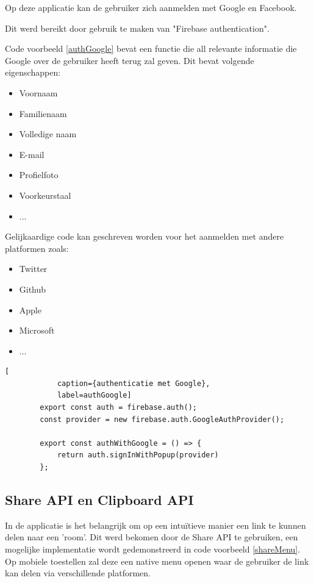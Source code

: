 		Op deze applicatie kan de gebruiker zich aanmelden met Google en Facebook.
		
		Dit werd bereikt door gebruik te maken van "Firebase authentication".
		
		\newpage
		Code voorbeeld \ref{authGoogle} bevat een functie die all relevante informatie die Google over de gebruiker heeft terug zal geven. Dit bevat volgende eigenschappen:
		\begin{itemize}
			\item Voornaam
			\item Familienaam
			\item Volledige naam
			\item E-mail
			\item Profielfoto
			\item Voorkeurstaal
			\item ...
		\end{itemize} 
		
		
		Gelijkaardige code kan geschreven worden voor het aanmelden met andere platformen zoals:
		\begin{itemize}
			\item Twitter
			\item Github
			\item Apple
			\item Microsoft
			\item ...
		\end{itemize} 
		
		\begin{lstlisting}[
			caption={authenticatie met Google},
			label=authGoogle]
		export const auth = firebase.auth();
		const provider = new firebase.auth.GoogleAuthProvider();
		
		export const authWithGoogle = () => {
			return auth.signInWithPopup(provider)
		};
		\end{lstlisting}
		
	\subsection{Share API en Clipboard API}
	
		In de applicatie is het belangrijk om op een intuïtieve manier een link te kunnen delen naar een 'room'. 
		Dit werd bekomen door de Share API te gebruiken, een mogelijke implementatie wordt gedemonstreerd in code voorbeeld \ref{shareMenu}.
		Op mobiele toestellen zal deze een native menu openen waar de gebruiker de link kan delen via verschillende platformen.
		
